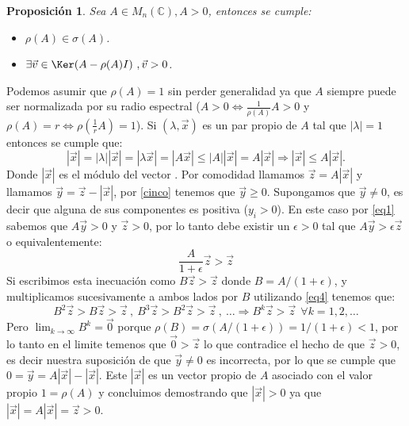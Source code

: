 \documentclass[size=a4, parskip=half, titlepage=false, toc=flat, toc=bib, 12pt]{scrartcl}
\makeatletter
\renewenvironment{proof}[1][\proofname] {\par\pushQED{\qed}\normalfont\topsep6\p@\@plus6\p@\relax\trivlist\item[\hskip\labelsep\itshape\tgpaella#1\@addpunct{.}]\ignorespaces}{\popQED\endtrivlist\@endpefalse}
\theoremstyle{theorem-style}
\newtheorem{nprop}{Proposición}[section]
\theoremstyle{definition-style}
\theoremstyle{remark-style}
\theoremstyle{example-style}
\theoremstyle{definition-style}
\theoremstyle{remark-style}
\renewcommand{\proofname}{\normalfont\tgpaella\bfseries\small DEMOSTRACIÓN}
\makeatother
\begin{document}
\begin{nprop}
\label{existevector}
Sea $A \in M_n(\mathbb{C}), A > 0$, entonces se cumple:
\begin{itemize}
\item $\rho(A) \in \sigma(A)$.
\item $\exists \vec{v} \in \Ker(A - \rho(A) I) \ , \vec{v} > 0$.
\end{itemize}
\end{nprop}
\begin{proof}
Podemos asumir que $\rho(A) = 1$ sin perder generalidad ya que $A$ siempre puede ser normalizada por su radio espectral ($A >0 \Leftrightarrow \frac{1}{\rho(A)} A > 0$ y $\rho(A) = r \Leftrightarrow \rho(\frac{1}{r}A) = 1$). Si $(\lambda, \vec{x})$ es un par propio de $A$ tal que $|\lambda| = 1$ entonces se cumple que:
\begin{equation} \label{cinco} |\vec{x}| = |\lambda||\vec{x}| = |\lambda \vec{x}| = |A \vec{x}| \leq |A||\vec{x}| = A |\vec{x}| \Rightarrow |\vec{x}| \leq A |\vec{x}|.  \end{equation}
Donde $|\vec{x}|$ es el módulo del vector . Por comodidad llamamos $\vec{z} = A |\vec{x}|$ y llamamos $\vec{y} = \vec{z} - |\vec{x}|$, por \ref{cinco} tenemos que $\vec{y} \geq 0$. Supongamos que $\vec{y} \neq 0$, es decir que alguna de sus componentes es positiva ($y_i > 0$). En este caso por \ref{eq1} sabemos que $A \vec{y} > 0$ y $\vec{z} > 0$, por lo tanto debe existir un $\epsilon >0$ tal que $A\vec{y} > \epsilon \vec{z}$ o equivalentemente:
$$\frac{A}{1 + \epsilon} \vec{z} > \vec{z} $$
Si escribimos esta inecuación como $B \vec{z} > \vec{z}$ donde $B = A /(1 + \epsilon)$, y multiplicamos sucesivamente a ambos lados por $B$ utilizando \ref{eq4} tenemos que:
$$B^2 \vec{z} > B \vec{z} > \vec{z} \ , \ B^3 \vec{z} > B^2 \vec{z} > \vec{z} \ , \ \dots \Rightarrow B^k \vec{z} > \vec{z} \ \ \forall k = 1, 2, \dots $$
Pero $\lim_{k \to \infty}B^k = \vec{0}$ porque $\rho(B) = \sigma(A/(1 + \epsilon)) = 1/(1 + \epsilon) < 1$, por lo tanto en el limite temenos que $\vec{0} > \vec{z}$ lo que contradice el hecho de que $\vec{z} >0$, es decir nuestra suposición de que $\vec{y} \neq 0$ es incorrecta, por lo que se cumple que $0 = \vec{y} = A |\vec{x}| - |\vec{x}|$. Este $|\vec{x}|$ es un vector propio de $A$ asociado con el valor propio $1 = \rho(A)$ y concluimos demostrando que $|\vec{x}|>0$ ya que $|\vec{x}| = A |\vec{x}| = \vec{z} > 0$.
\end{proof}
\end{document}
